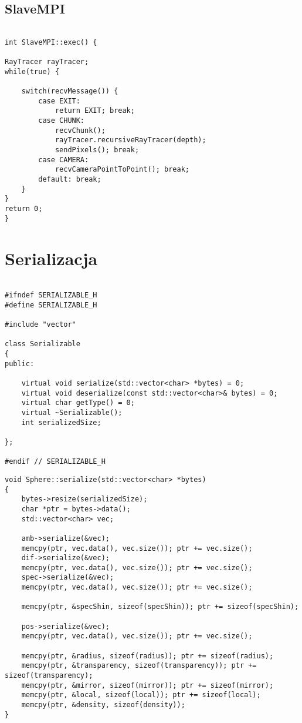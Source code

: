 \subsection{SlaveMPI}

\begin{lstlisting}

int SlaveMPI::exec() {

RayTracer rayTracer;
while(true) {

    switch(recvMessage()) {
        case EXIT:
            return EXIT; break;
        case CHUNK:
            recvChunk();
            rayTracer.recursiveRayTracer(depth);
            sendPixels(); break;
        case CAMERA:
            recvCameraPointToPoint(); break;
        default: break;
    }
}
return 0;
}

\end{lstlisting}

\section{Serializacja}


\begin{lstlisting}

#ifndef SERIALIZABLE_H
#define SERIALIZABLE_H

#include "vector"

class Serializable
{
public:

    virtual void serialize(std::vector<char> *bytes) = 0;
    virtual void deserialize(const std::vector<char>& bytes) = 0;
    virtual char getType() = 0;
    virtual ~Serializable();
    int serializedSize;

};

#endif // SERIALIZABLE_H

\end{lstlisting}



\begin{lstlisting}
void Sphere::serialize(std::vector<char> *bytes)
{
    bytes->resize(serializedSize);
    char *ptr = bytes->data();
    std::vector<char> vec;

    amb->serialize(&vec);
    memcpy(ptr, vec.data(), vec.size()); ptr += vec.size();
    dif->serialize(&vec);
    memcpy(ptr, vec.data(), vec.size()); ptr += vec.size();
    spec->serialize(&vec);
    memcpy(ptr, vec.data(), vec.size()); ptr += vec.size();

    memcpy(ptr, &specShin, sizeof(specShin)); ptr += sizeof(specShin);

    pos->serialize(&vec);
    memcpy(ptr, vec.data(), vec.size()); ptr += vec.size();

    memcpy(ptr, &radius, sizeof(radius)); ptr += sizeof(radius);
    memcpy(ptr, &transparency, sizeof(transparency)); ptr += sizeof(transparency);
    memcpy(ptr, &mirror, sizeof(mirror)); ptr += sizeof(mirror);
    memcpy(ptr, &local, sizeof(local)); ptr += sizeof(local);
    memcpy(ptr, &density, sizeof(density));
}
\end{lstlisting}


